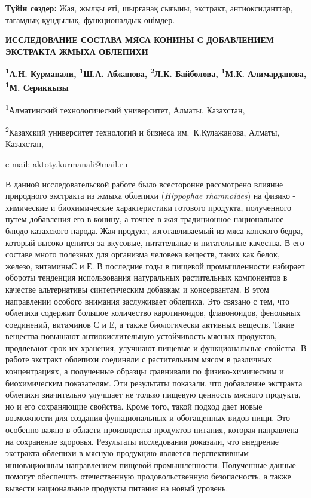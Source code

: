 {\bfseries Түйін сөздер:} Жая, жылқы еті, шырғанақ сығыны, экстракт,
антиоксиданттар, тағамдық құндылық, функционалдық өнімдер.

\begin{articleheader}
{\bfseries ИССЛЕДОВАНИЕ СОСТАВА МЯСА КОНИНЫ С ДОБАВЛЕНИЕМ ЭКСТРАКТА ЖМЫХА ОБЛЕПИХИ}

{\bfseries
\textsuperscript{1}А.Н. Курманали\textsuperscript{\envelope },
\textsuperscript{1}Ш.А. Абжанова,
\textsuperscript{2}Л.К. Байболова,
\textsuperscript{1}М.К. Алимарданова,
\textsuperscript{1}М. Сериккызы
}
\end{articleheader}

\begin{affiliation}
\textsuperscript{1}Алматинский технологический университет, Алматы, Казахстан,

\textsuperscript{2}Казахский университет технологий и бизнеса им.~К.Кулажанова, Алматы, Казахстан,

e-mail: aktoty.kurmanali@mail.ru
\end{affiliation}

В данной исследовательской работе было всесторонне рассмотрено влияние
природного экстракта из жмыха облепихи (\emph{Hippophae rhamnoides}) на
физико - химические и биохимические характеристики готового продукта,
полученного путем добавления его в конину, а точнее в жая традиционное
национальное блюдо казахского народа. Жая-продукт, изготавливаемый из
мяса конского бедра, который высоко ценится за вкусовые, питательные и
питательные качества. В его составе много полезных для организма
человека веществ, таких как белок, железо, витаминыС и Е. В последние
годы в пищевой промышленности набирает обороты тенденция использования
натуральных растительных компонентов в качестве альтернативы
синтетическим добавкам и консервантам. В этом направлении особого
внимания заслуживает облепиха. Это связано с тем, что облепиха содержит
большое количество каротиноидов, флавоноидов, фенольных соединений,
витаминов С и Е, а также биологически активных веществ. Такие вещества
повышают антиокислительную устойчивость мясных продуктов, продлевают
срок их хранения, улучшают пищевые и функциональные свойства. В работе
экстракт облепихи соединяли с растительным мясом в различных
концентрациях, а полученные образцы сравнивали по физико-химическим и
биохимическим показателям. Эти результаты показали, что добавление
экстракта облепихи значительно улучшает не только пищевую ценность
мясного продукта, но и его сохраняющие свойства. Кроме того, такой
подход дает новые возможности для создания функциональных и обогащенных
видов пищи. Это особенно важно в области производства продуктов питания,
которая направлена на сохранение здоровья. Результаты исследования
доказали, что внедрение экстракта облепихи в мясную продукцию является
перспективным инновационным направлением пищевой промышленности.
Полученные данные помогут обеспечить отечественную продовольственную
безопасность, а также вывести национальные продукты питания на новый
уровень.

